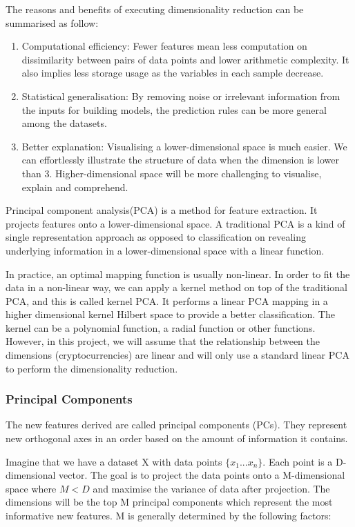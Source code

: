 \documentclass[11pt]{article} %
\theoremstyle{plain}
\theoremstyle{definition}
\begin{document}
The reasons and benefits of executing dimensionality reduction can be summarised as follow:
\begin{enumerate}
  \item Computational efficiency: Fewer features mean less computation on dissimilarity between pairs of data points and lower arithmetic complexity. It also implies less storage usage as the variables in each sample decrease.
  \item Statistical generalisation: By removing noise or irrelevant information from the inputs for building models, the prediction rules can be more general among the datasets.
  \item Better explanation: Visualising a lower-dimensional space is much easier. We can effortlessly illustrate the structure of data when the dimension is lower than 3. Higher-dimensional space will be more challenging to visualise, explain and comprehend.
\end{enumerate}

Principal component analysis(PCA) is a method for feature extraction. It projects features onto a lower-dimensional space. A traditional PCA is a kind of single representation approach as opposed to classification on revealing underlying information in a lower-dimensional space with a linear function.

In practice, an optimal mapping function is usually non-linear. In order to fit the data in a non-linear way, we can apply a kernel method on top of the traditional PCA, and this is called kernel PCA. It performs a linear PCA mapping in a higher dimensional kernel Hilbert space to provide a better classification. The kernel can be a polynomial function, a radial function or other functions\cite{hessam/kpca:2014}. However, in this project, we will assume that the relationship between the dimensions (cryptocurrencies) are linear and will only use a standard linear PCA to perform the dimensionality reduction.

\subsubsection{Principal Components}

The new features derived are called principal components (PCs). They represent new orthogonal axes in an order based on the amount of information it contains.

Imagine that we have a dataset X with data points $\{{x_1} ... {x_n}\}$. Each point is a D-dimensional vector. The goal is to project the data points onto a M-dimensional space where $M < D$ and maximise the variance of data after projection. The dimensions will be the top M principal components which represent the most informative new features. M is generally determined by the following factors:
\end{document}
